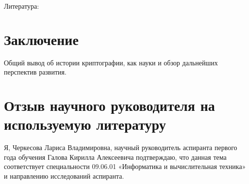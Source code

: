 Литература: \cite{scarani2004quantum, ch1984quantum, lo2005decoy}

\section{Заключение}
Общий вывод об истории криптографии, как науки и обзор дальнейших перспектив развития.



\clearpage
{}
\section*{Отзыв научного руководителя на используемую литературу}
Я, Черкесова Лариса Владимировна, научный руководитель аспиранта первого года обучения Галова Кирилла Алексеевича подтверждаю, что данная тема соответствует специальности 09.06.01 «Информатика и вычислительная техника» и направлению исследований аспиранта.
\bigskip


